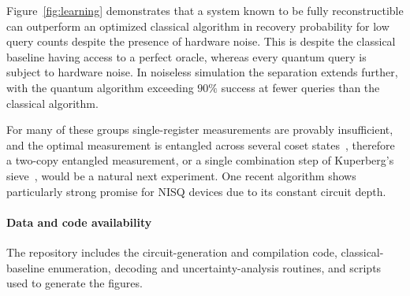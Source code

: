 Figure~\ref{fig:learning} demonstrates that a system known to be fully reconstructible can outperform an optimized classical algorithm in recovery probability for low query counts despite the presence of hardware noise. This is despite the classical baseline having access to a perfect oracle, whereas every quantum query is subject to hardware noise. In noiseless simulation the separation extends further, with the quantum algorithm exceeding $90\%$ success at fewer queries than the classical algorithm.

 For many of these groups single-register measurements are provably insufficient, and the optimal measurement is entangled across several coset states~\cite{ettinger2004quantum,bacon2005optimal,hallgren2010limitations}, therefore a two-copy entangled measurement, or a single combination step of Kuperberg's sieve~\cite{kuperberg2005subexponential}, would be a natural next experiment.  One recent algorithm \cite{lee2025learning} shows particularly strong promise for NISQ devices due to its constant circuit depth.

\paragraph*{Data and code availability}  The repository includes the circuit-generation and compilation code, classical-baseline enumeration, decoding and uncertainty-analysis routines, and scripts used to generate the figures.

